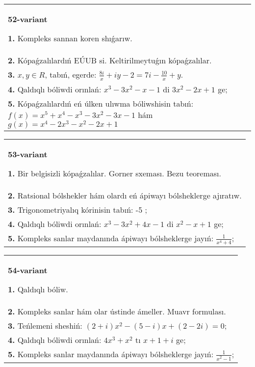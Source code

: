 \documentclass{article}
\begin{document}
\begin{tabular}{m{17cm}}
\textbf{52-variant}
\newline

\textbf{1.} Kompleks sannan koren shıǵarıw. \\
\textbf{2.} Kópaǵzalılardıń EÚUB si. Keltirilmeytuǵın   kópaǵzalılar. \\
\textbf{3.} $x, y \in R$, tabıń, egerde:  $\frac{8 i}{x}+i y-2=7 i-\frac{10}{x}+y$. \\
\textbf{4.} Qaldıqlı bóliwdi orınlań: $x^3-3 x^2-x-1$ di $3 x^2-2 x+1$ ge; \\
\textbf{5.} Kópaǵzalılardıń eń úlken ulıwma bóliwshisin tabıń: $f(x)=x^5+x^4-x^3-3 x^2-3 x-1$ hám $g(x)=x^4-2 x^3-x^2-2 x+1$ \\

\end{tabular}
\vspace{1cm}


\begin{tabular}{m{17cm}}
\textbf{53-variant}
\newline

\textbf{1.} Bir belgisizli kópaǵzalılar. Gorner sxeması. Bezu teoreması.  \\
\textbf{2.} Ratsional bólshekler hám olardı eń ápiwayı bólsheklerge ajıratıw. \\
\textbf{3.} Trigonometriyalıq kórinisin tabıń: -5 ;  \\
\textbf{4.} Qaldıqlı bóliwdi orınlań:  $x^3-3 x^2+4 x-1$ di $x^2-x+1$ ge; \\
\textbf{5.} Kompleks sanlar maydanında ápiwayı bólsheklerge jayıń: $\frac{1}{x^4+4}$; \\

\end{tabular}
\vspace{1cm}


\begin{tabular}{m{17cm}}
\textbf{54-variant}
\newline

\textbf{1.} Qaldıqlı bóliw.  \\
\textbf{2.} Kompleks sanlar hám olar ústinde ámeller. Muavr formulası.  \\
\textbf{3.} Teńlemeni sheshiń:  $(2+i) x^2-(5-i) x+(2-2 i)=0$; \\
\textbf{4.} Qaldıqlı bóliwdi orınlań: $4 x^3+x^2$ tı $x+1+i$ ge; \\
\textbf{5.} Kompleks sanlar maydanında ápiwayı bólsheklerge jayıń: $\frac{1}{x^2-1}$; \\

\end{tabular}
\vspace{1cm}
\end{document}
